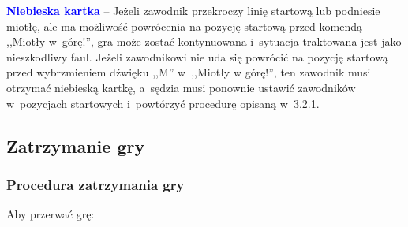 \documentclass[12pt,a4paper]{article}
\newcommand\bluecard[1]{\bgroup\textcolor{blue}{\textbf{#1}}}
\begin{document}
\bluecard{Niebieska kartka} -- Jeżeli zawodnik przekroczy linię startową lub
podniesie miotłę, ale ma możliwość powrócenia na pozycję startową przed
komendą ,,Miotły w~górę!'', gra może zostać kontynuowana i~sytuacja
traktowana jest jako nieszkodliwy faul. Jeżeli zawodnikowi nie uda się
powrócić na pozycję startową przed wybrzmieniem dźwięku ,,M'' w~,,Miotły
w górę!'', ten zawodnik musi otrzymać niebieską kartkę, a~sędzia musi
ponownie ustawić zawodników w~pozycjach startowych i~powtórzyć procedurę
opisaną w~3.2.1.

\subsection{Zatrzymanie gry}

\subsubsection{Procedura zatrzymania gry}
Aby przerwać grę:
\end{document}
